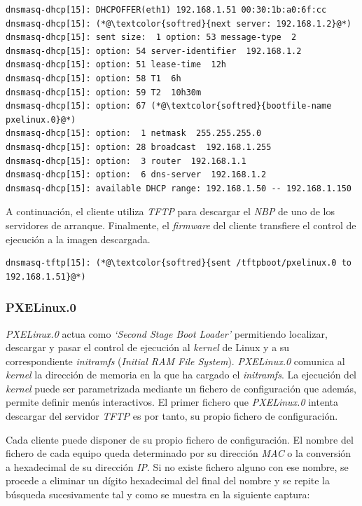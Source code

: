 \documentclass[a4paper,12pt,spanish,final]{epsc_tfc_pfc}
\begin{document}
\begin{lstlisting}[style=dnsmasq]
dnsmasq-dhcp[15]: DHCPOFFER(eth1) 192.168.1.51 00:30:1b:a0:6f:cc
dnsmasq-dhcp[15]: (*@\textcolor{softred}{next server: 192.168.1.2}@*)
dnsmasq-dhcp[15]: sent size:  1 option: 53 message-type  2
dnsmasq-dhcp[15]: option: 54 server-identifier  192.168.1.2
dnsmasq-dhcp[15]: option: 51 lease-time  12h
dnsmasq-dhcp[15]: option: 58 T1  6h
dnsmasq-dhcp[15]: option: 59 T2  10h30m
dnsmasq-dhcp[15]: option: 67 (*@\textcolor{softred}{bootfile-name  pxelinux.0}@*)
dnsmasq-dhcp[15]: option:  1 netmask  255.255.255.0
dnsmasq-dhcp[15]: option: 28 broadcast  192.168.1.255
dnsmasq-dhcp[15]: option:  3 router  192.168.1.1
dnsmasq-dhcp[15]: option:  6 dns-server  192.168.1.2
dnsmasq-dhcp[15]: available DHCP range: 192.168.1.50 -- 192.168.1.150
\end{lstlisting}

A continuación, el cliente utiliza \emph{TFTP} para descargar el \emph{NBP} de uno de los servidores de arranque. Finalmente, el \emph{firmware} del cliente transfiere el control de ejecución a la imagen descargada.\\

\begin{lstlisting}[style=dnsmasq]
dnsmasq-tftp[15]: (*@\textcolor{softred}{sent /tftpboot/pxelinux.0 to 192.168.1.51}@*)
\end{lstlisting}

\subsubsection{PXELinux.0}
\emph{PXELinux.0} actua como \emph{`Second Stage Boot Loader'} permitiendo localizar, descargar y pasar el control de ejecución al \emph{kernel} de Linux y a su correspondiente \emph{initramfs} (\emph{Initial RAM File System}). \emph{PXELinux.0} comunica al \emph{kernel} la dirección de memoria en la que ha cargado el \emph{initramfs}. La ejecución del \emph{kernel} puede ser parametrizada mediante un fichero de configuración que además, permite definir menús interactivos. El primer fichero que \emph{PXELinux.0} intenta descargar del servidor \emph{TFTP} es por tanto, su propio fichero de configuración.

Cada cliente puede disponer de su propio fichero de configuración. El nombre del fichero de cada equipo queda determinado por su dirección \emph{MAC} o la conversión a hexadecimal de su dirección \emph{IP}. Si no existe fichero alguno con ese nombre, se procede a eliminar un dígito hexadecimal del final del nombre y se repite la búsqueda sucesivamente tal y como se muestra en la siguiente captura:\\
\end{document}
